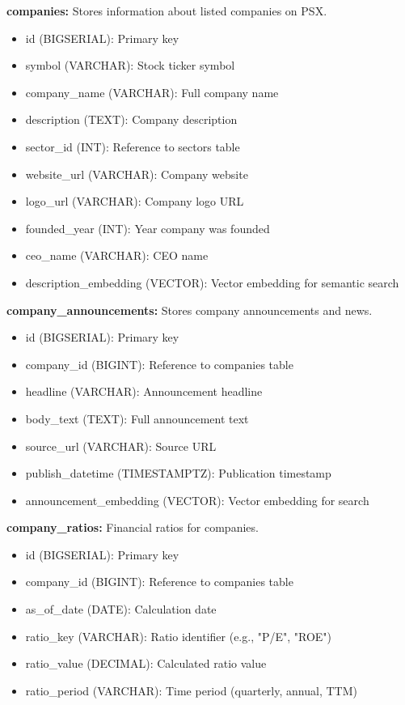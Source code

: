 \documentclass[12pt,a4paper]{report}
\begin{document}
\textbf{companies:} Stores information about listed companies on PSX.
\begin{itemize}
    \item id (BIGSERIAL): Primary key
    \item symbol (VARCHAR): Stock ticker symbol
    \item company\_name (VARCHAR): Full company name
    \item description (TEXT): Company description
    \item sector\_id (INT): Reference to sectors table
    \item website\_url (VARCHAR): Company website
    \item logo\_url (VARCHAR): Company logo URL
    \item founded\_year (INT): Year company was founded
    \item ceo\_name (VARCHAR): CEO name
    \item description\_embedding (VECTOR): Vector embedding for semantic search
\end{itemize}

\textbf{company\_announcements:} Stores company announcements and news.
\begin{itemize}
    \item id (BIGSERIAL): Primary key
    \item company\_id (BIGINT): Reference to companies table
    \item headline (VARCHAR): Announcement headline
    \item body\_text (TEXT): Full announcement text
    \item source\_url (VARCHAR): Source URL
    \item publish\_datetime (TIMESTAMPTZ): Publication timestamp
    \item announcement\_embedding (VECTOR): Vector embedding for search
\end{itemize}

\textbf{company\_ratios:} Financial ratios for companies.
\begin{itemize}
    \item id (BIGSERIAL): Primary key
    \item company\_id (BIGINT): Reference to companies table
    \item as\_of\_date (DATE): Calculation date
    \item ratio\_key (VARCHAR): Ratio identifier (e.g., "P/E", "ROE")
    \item ratio\_value (DECIMAL): Calculated ratio value
    \item ratio\_period (VARCHAR): Time period (quarterly, annual, TTM)
\end{itemize}
\end{document}
